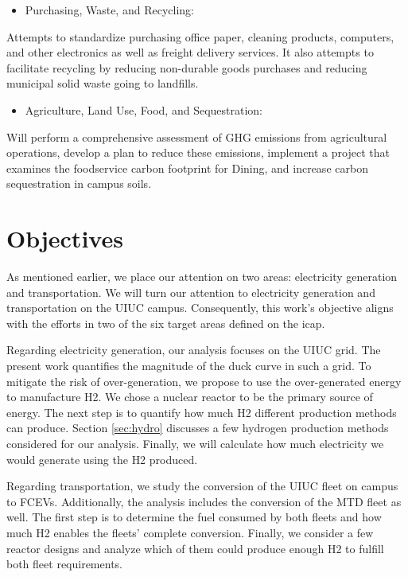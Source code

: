 \begin{itemize}
	\item Purchasing, Waste, and Recycling:
\end{itemize}
Attempts to standardize purchasing office paper, cleaning products, computers, and other electronics as well as freight delivery services.
It also attempts to facilitate recycling by reducing non-durable goods purchases and reducing municipal solid waste going to landfills.

\begin{itemize}
	\item Agriculture, Land Use, Food, and Sequestration:
\end{itemize}
Will perform a comprehensive assessment of \gls{GHG} emissions from agricultural operations, develop a plan to reduce these emissions, implement a project that examines the foodservice carbon footprint for Dining, and increase carbon sequestration in campus soils.

\section{Objectives}

As mentioned earlier, we place our attention on two areas: electricity generation and transportation.
We will turn our attention to electricity generation and transportation on the \gls{UIUC} campus.
Consequently, this work's objective aligns with the efforts in two of the six target areas defined on the \gls{icap}.

Regarding electricity generation, our analysis focuses on the \gls{UIUC} grid.
The present work quantifies the magnitude of the duck curve in such a grid.
To mitigate the risk of over-generation, we propose to use the over-generated energy to manufacture \gls{H2}.
We chose a nuclear reactor to be the primary source of energy.
The next step is to quantify how much \gls{H2} different production methods can produce.
Section \ref{sec:hydro} discusses a few hydrogen production methods considered for our analysis.
Finally, we will calculate how much electricity we would generate using the \gls{H2} produced.

Regarding transportation, we study the conversion of the \gls{UIUC} fleet on campus to \glspl{FCEV}.
Additionally, the analysis includes the conversion of the \gls{MTD} fleet as well.
The first step is to determine the fuel consumed by both fleets and how much \gls{H2} enables the fleets' complete conversion.
Finally, we consider a few reactor designs and analyze which of them could produce enough \gls{H2} to fulfill both fleet requirements.

